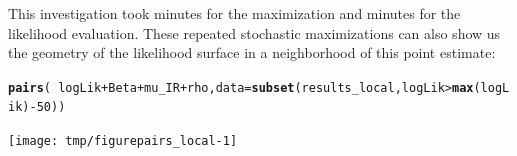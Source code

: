 \documentclass{beamer}\usepackage[]{graphicx}\usepackage[]{color}
\makeatletter
\newcommand{\hlnum}[1]{\textcolor[rgb]{0.686,0.059,0.569}{#1}}%
\newcommand{\hlopt}[1]{\textcolor[rgb]{0,0,0}{#1}}%
\newcommand{\hlstd}[1]{\textcolor[rgb]{0.345,0.345,0.345}{#1}}%
\newcommand{\hlkwc}[1]{\textcolor[rgb]{0.333,0.667,0.333}{#1}}%
\newcommand{\hlkwd}[1]{\textcolor[rgb]{0.737,0.353,0.396}{\textbf{#1}}}%
\newenvironment{kframe}{%
 \def\at@end@of@kframe{}%
 \ifinner\ifhmode%
  \def\at@end@of@kframe{\end{minipage}}%
  \begin{minipage}{\columnwidth}%
 \fi\fi%
 \def\FrameCommand##1{\hskip\@totalleftmargin \hskip-\fboxsep
 \colorbox{shadecolor}{##1}\hskip-\fboxsep
     \hskip-\linewidth \hskip-\@totalleftmargin \hskip\columnwidth}%
 \MakeFramed {\advance\hsize-\width
   \@totalleftmargin\z@ \linewidth\hsize
   \@setminipage}}%
 {\par\unskip\endMakeFramed%
 \at@end@of@kframe}
\newenvironment{knitrout}{}{} %
\makeatother
\begin{document}
\begin{frame}[fragile]
\bi
\item  This investigation took   minutes for the maximization and  minutes for the likelihood evaluation. These repeated stochastic maximizations can also show us the geometry of the likelihood surface in a neighborhood of this point estimate:
\ei

\begin{knitrout}\small
{}\color{fgcolor}\begin{kframe}
\begin{alltt}
\hlkwd{pairs}\hlstd{(}\hlopt{~}\hlstd{logLik}\hlopt{+}\hlstd{Beta}\hlopt{+}\hlstd{mu_IR}\hlopt{+}\hlstd{rho,}\hlkwc{data}\hlstd{=}\hlkwd{subset}\hlstd{(results_local,logLik}\hlopt{>}\hlkwd{max}\hlstd{(logLik)}\hlopt{-}\hlnum{50}\hlstd{))}
\end{alltt}
\end{kframe}

{\centering \texttt{[image: tmp/figurepairs\_local-1]} 

}



\end{knitrout}

\end{frame}   
\end{document}
